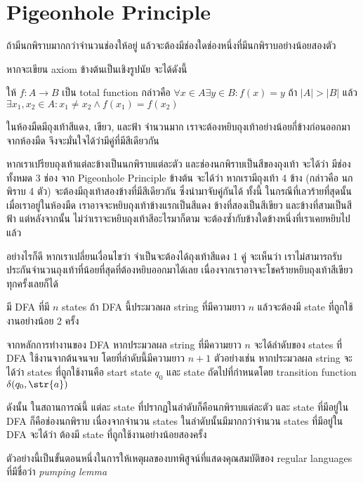 \section{Pigeonhole Principle}
\begin{axiom}
ถ้ามีนกพิราบมากกว่าจำนวนช่องให้อยู่ แล้วจะต้องมีช่องใดช่องหนึ่งที่มีนกพิราบอย่างน้อยสองตัว
\end{axiom}
หากจะเขียน axiom ข้างต้นเป็นเชิงรูปนัย จะได้ดังนี้
\begin{axiom}
ให้ $f:A\to B$ เป็น total function กล่าวคือ $\forall x\in A\exists y\in B: f(x)=y$ \enskip ถ้า $|A|>|B|$ แล้ว $\exists x_1,x_2\in A: x_1\neq x_2 \wedge f(x_1)=f(x_2)$
\end{axiom}

\begin{example}
ในห้องมืดมีถุงเท้าสีแดง, เขียว, และฟ้า จำนวนมาก \enskip เราจะต้องหยิบถุงเท้าอย่างน้อยกี่ข้างก่อนออกมาจากห้องมืด จึงจะมั่นใจได้ว่ามีคู่ที่มีสีเดียวกัน

หากเราเปรียบถุงเท้าแต่ละข้างเป็นนกพิราบแต่ละตัว และช่องนกพิราบเป็นสีของถุงเท้า จะได้ว่า มีช่องทั้งหมด 3 ช่อง \enskip จาก Pigeonhole Principle ข้างต้น จะได้ว่า หากเรามีถุงเท้า 4 ข้าง (กล่าวคือ นกพิราบ 4 ตัว) จะต้องมีถุงเท้าสองข้างที่มีสีเดียวกัน ซึ่งนำมาจับคู่กันได้ \enskip ทั้งนี้ ในกรณีที่เลวร้ายที่สุดนั้น เมื่อเราอยู่ในห้องมืด เราอาจจะหยิบถุงเท้าข้างแรกเป็นสีแดง ข้างที่สองเป็นสีเขียว และข้างที่สามเป็นสีฟ้า \enskip แต่หลังจากนั้น ไม่ว่าเราจะหยิบถุงเท้าสีอะไรมาก็ตาม จะต้องซ้ำกับข้างใดข้างหนึ่งที่เราเคยหยิบไปแล้ว

อย่างไรก็ดี หากเราเปลี่ยนเงื่อนไขว่า จำเป็นจะต้องได้ถุงเท้าสีแดง 1 คู่ จะเห็นว่า เราไม่สามารถรับประกันจำนวนถุงเท้าที่น้อยที่สุดที่ต้องหยิบออกมาได้เลย เนื่องจากเราอาจจะโชคร้ายหยิบถุงเท้าสีเขียวทุกครั้งเลยก็ได้
\end{example}

\begin{example}
มี DFA ที่มี $n$ states \enskip ถ้า DFA นี้ประมวลผล string ที่มีความยาว $n$ แล้วจะต้องมี state ที่ถูกใช้งานอย่างน้อย 2 ครั้ง

จากหลักการทำงานของ DFA หากประมวลผล string ที่มีความยาว $n$ จะได้ลำดับของ states ที่ DFA ใช้งานจากต้นจนจบ โดยที่ลำดับนี้มีความยาว $n+1$ \enskip ตัวอย่างเช่น หากประมวลผล string  จะได้ว่า states ที่ถูกใช้งานคือ start state $q_0$ และ state ถัดไปที่กำหนดโดย transition function $\delta(q_0,\str{a})$

ดังนั้น ในสถานการณ์นี้ แต่ละ state ที่ปรากฏในลำดับก็คือนกพิราบแต่ละตัว และ state ที่มีอยู่ใน DFA ก็คือช่องนกพิราบ \enskip เนื่องจากจำนวน states ในลำดับนั้นมีมากกว่าจำนวน states ที่มีอยู่ใน DFA จะได้ว่า ต้องมี state ที่ถูกใช้งานอย่างน้อยสองครั้ง

ตัวอย่างนี้เป็นขั้นตอนหนึ่งในการให้เหตุผลของบทพิสูจน์ที่แสดงคุณสมบัติของ regular languages ที่มีชื่อว่า \emph{pumping lemma}
\end{example}

